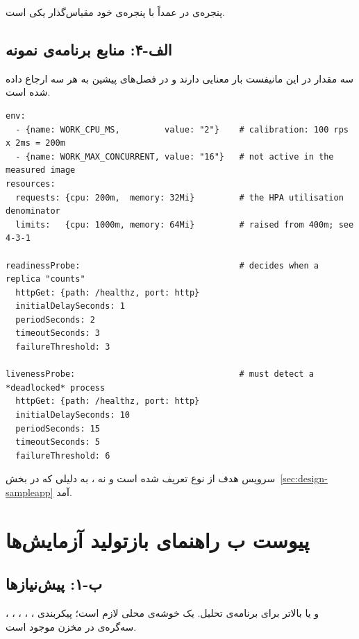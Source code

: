 پنجره‌ی \lr{[1m]} در  عمداً با پنجره‌ی  خود مقیاس‌گذار یکی است.

\subsection*{الف-۴: منابع برنامه‌ی نمونه}

سه مقدار در این مانیفست بار معنایی دارند و در فصل‌های پیشین به هر سه ارجاع داده شده است.

\begin{latin}
\begin{lstlisting}[language=yamlx]
env:
  - {name: WORK_CPU_MS,         value: "2"}    # calibration: 100 rps x 2ms = 200m
  - {name: WORK_MAX_CONCURRENT, value: "16"}   # not active in the measured image
resources:
  requests: {cpu: 200m,  memory: 32Mi}         # the HPA utilisation denominator
  limits:   {cpu: 1000m, memory: 64Mi}         # raised from 400m; see 4-3-1

readinessProbe:                                # decides when a replica "counts"
  httpGet: {path: /healthz, port: http}
  initialDelaySeconds: 1
  periodSeconds: 2
  timeoutSeconds: 3
  failureThreshold: 3

livenessProbe:                                 # must detect a *deadlocked* process
  httpGet: {path: /healthz, port: http}
  initialDelaySeconds: 10
  periodSeconds: 15
  timeoutSeconds: 5
  failureThreshold: 6
\end{lstlisting}
\end{latin}

سرویس هدف از نوع  تعریف شده است و نه ، به دلیلی که در
بخش~\ref{sec:design-sampleapp} آمد.

\section*{پیوست ب \mdash{} راهنمای بازتولید آزمایش‌ها}

\subsection*{ب-۱: پیش‌نیازها}

، ، ، ، ، و  یا بالاتر
برای برنامه‌ی تحلیل. یک خوشه‌ی  محلی لازم است؛ پیکربندی سه‌گره‌ی  در
مخزن موجود است.


